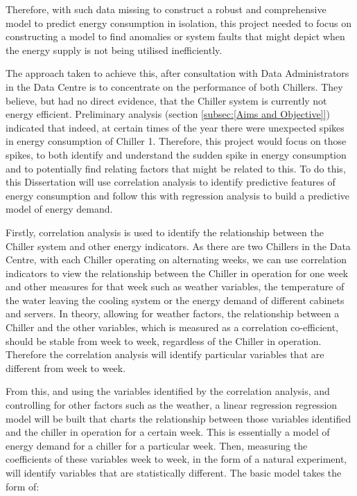 \documentclass[12pt]{scrartcl}
\begin{document}
Therefore, with such data missing to construct a robust and comprehensive model to predict energy consumption in isolation, this project needed to focus on constructing a model to find anomalies or system faults that might depict when the energy supply is not being utilised inefficiently.  

The approach taken to achieve this, after consultation with Data Administrators in the Data Centre is to concentrate on the performance of both Chillers. They believe, but had no direct evidence, that the Chiller system is currently not energy efficient. Preliminary analysis (section \ref{subsec:[Aims and Objective]}) indicated that indeed, at certain times of the year there were unexpected spikes in energy consumption of Chiller 1. Therefore, this project would focus on those spikes, to both identify and understand the sudden spike in energy consumption and to potentially find relating factors that might be related to this. To do this, this Dissertation will use correlation analysis to identify predictive features of energy consumption and follow this with regression analysis to build a predictive model of energy demand.

 

Firstly, correlation analysis is used to identify the relationship between the Chiller system and other energy indicators. As there are two Chillers in the Data Centre, with each Chiller operating on alternating weeks, we can use correlation indicators to view the relationship between the Chiller in operation for one week and other measures for that week such as weather variables, the temperature of the water leaving the cooling system or the energy demand of different cabinets and servers. In theory, allowing for weather factors, the relationship between a Chiller and the other variables, which is measured as a correlation co-efficient, should be stable from week to week, regardless of the Chiller in operation. Therefore the correlation analysis will identify particular variables that are different from week to week.

 

From this, and using the variables identified by the correlation analysis, and controlling for other factors such as the weather, a linear regression regression model will be built that charts the relationship between those variables identified and the chiller in operation for a certain week. This is essentially a model of energy demand for a chiller for a particular week. Then, measuring the coefficients of these variables week to week, in the form of a natural experiment, will identify variables that are statistically different. The basic model takes the form of:
\end{document}
